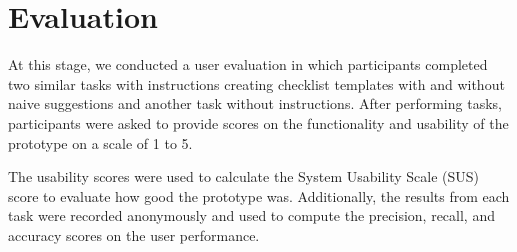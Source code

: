 \section{Evaluation}
At this stage, we conducted a user evaluation in which participants completed two similar tasks with instructions creating checklist templates with and without naive suggestions and another task without instructions. After performing tasks, participants were asked to provide scores on the functionality and usability of the prototype on a scale of 1 to 5.

The usability scores were used to calculate the System Usability Scale (SUS) score \cite{susscores} to evaluate how good the prototype was. Additionally, the results from each task were recorded anonymously and used to compute the precision, recall, and accuracy scores \cite{rocanalysis} on the user performance.